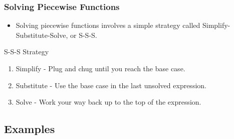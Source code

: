 \message{ !name(recursion.tex)}\documentclass[fleqn, t]{beamer}
\begin{document}
\begin{frame}
  \frametitle{Solving Piecewise Functions}
  \begin{itemize}[<+->]
  \item Solving piecewise functions involves a simple strategy called
    Simplify-Substitute-Solve, or S-S-S. 
  \end{itemize}
  \begin{block}{S-S-S Strategy}
    \begin{enumerate}[<+->]
    \item Simplify - Plug and chug until you reach the base case. 
    \item Substitute - Use the base case in the last unsolved expression. 
    \item Solve - Work your way back up to the top of the expression.
    \end{enumerate}
  \end{block}
  \begin{figure}
  \end{figure}
\end{frame}

\subsection{Examples}
\end{document}
